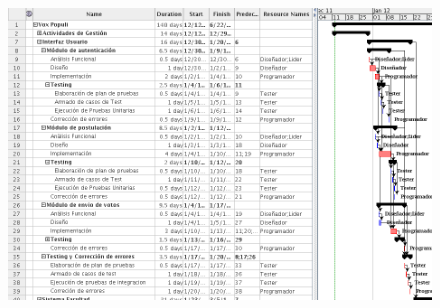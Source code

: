 \par
\begin{figure}[H]
\begin{center}
\includegraphics[scale=0.6]{./imagenes/gantiteracion.png}
\end{center}
\end{figure}




